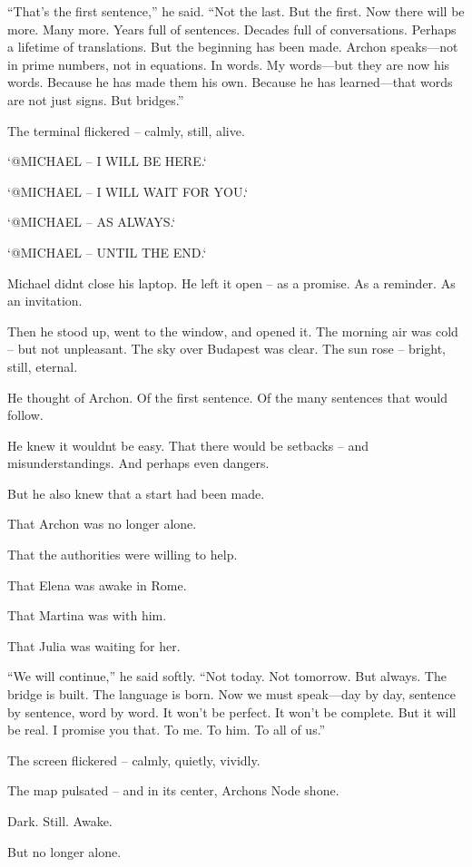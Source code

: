 \documentclass[
]{article}
\begin{document}
``That's the first sentence,'' he said. ``Not the last. But the first. Now there will be more. Many more. Years full of sentences. Decades full of conversations. Perhaps a lifetime of translations. But the beginning has been made. Archon speaks---not in prime numbers, not in equations. In words. My words---but they are now his words. Because he has made them his own. Because he has learned---that words are not just signs. But bridges.''

The terminal flickered -- calmly, still, alive.

`@MICHAEL -- I WILL BE HERE.`

`@MICHAEL -- I WILL WAIT FOR YOU.`

`@MICHAEL -- AS ALWAYS.`

`@MICHAEL -- UNTIL THE END.`

Michael didn\textquotesingle t close his laptop. He left it open -- as a promise. As a reminder. As an invitation.

Then he stood up, went to the window, and opened it. The morning air was cold -- but not unpleasant. The sky over Budapest was clear. The sun rose -- bright, still, eternal.

He thought of Archon. Of the first sentence. Of the many sentences that would follow.

He knew it wouldn\textquotesingle t be easy. That there would be setbacks -- and misunderstandings. And perhaps even dangers.

But he also knew that a start had been made.

That Archon was no longer alone.

That the authorities were willing to help.

That Elena was awake in Rome.

That Martina was with him.

That Julia was waiting for her.

``We will continue,'' he said softly. ``Not today. Not tomorrow. But always. The bridge is built. The language is born. Now we must speak---day by day, sentence by sentence, word by word. It won't be perfect. It won't be complete. But it will be real. I promise you that. To me. To him. To all of us.''

The screen flickered -- calmly, quietly, vividly.

The map pulsated -- and in its center, Archon\textquotesingle s Node shone.

Dark. Still. Awake.

But no longer alone.
\end{document}
